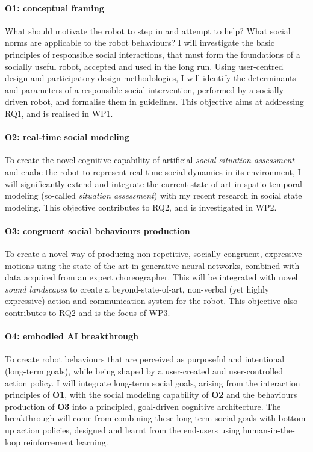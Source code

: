 \paragraph{\bf O1: conceptual framing} What should motivate the robot to step in
and attempt to help? What social norms are applicable to the robot behaviours? I
will investigate the basic principles of responsible social interactions, that
must form the foundations of a socially useful robot, accepted and used in the
long run.  Using user-centred design and participatory design methodologies, I
will identify the determinants and parameters of a responsible social
intervention, performed by a socially-driven robot, and formalise them in
guidelines. This objective aims at addressing RQ1, and is realised in WP1.

\paragraph{\bf O2: real-time social modeling} To create the novel cognitive
capability of artificial \emph{social situation assessment} and enabe the
robot to represent real-time social dynamics in its environment, I will
significantly extend and integrate the current state-of-art in spatio-temporal
modeling (so-called \emph{situation assessment}) with my recent research in social
state modeling. This objective contributes to RQ2, and is investigated in
WP2.

\paragraph{\bf O3: congruent social behaviours production} 
To create a novel way of producing non-repetitive, socially-congruent,
expressive motions using the state of the art in generative neural networks,
combined with data acquired from an expert choreographer. This will be
integrated with novel \emph{sound landscapes} to create a beyond-state-of-art,
non-verbal (yet highly expressive) action and communication system for the
robot. This objective also contributes to RQ2 and is the focus of WP3.

\paragraph{\bf O4: embodied AI breakthrough} To create robot behaviours that are
perceived as purposeful and intentional (long-term goals), while being shaped by
a user-created and user-controlled action policy. I will integrate long-term
social goals, arising from the interaction principles of \textbf{O1}, with the
social modeling capability of \textbf{O2} and the behaviours production of
\textbf{O3} into a principled, goal-driven cognitive architecture. The
breakthrough will come from combining these long-term social goals with
bottom-up action policies, designed and learnt from the end-users using
human-in-the-loop reinforcement learning.


